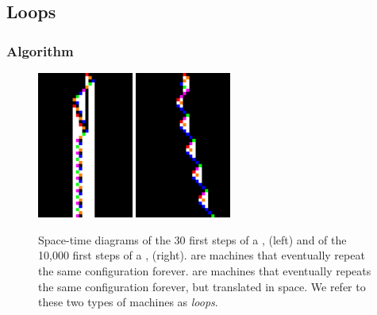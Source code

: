 \newpage
\subsection{Loops}\label{sec:loops}
\subsubsection{Algorithm}\label{sec:loops:algo}

\begin{figure}[h!]
    \centering
    \includegraphics[width=0.28\textwidth]{figures/space-time-diagrams/cycler_279081.pdf}
    \hspace{10ex}
    \includegraphics[width=0.28\textwidth]{figures/space-time-diagrams/tc_1RB---_1LB1LC_0RD0RC_1LE1RE_1LA0LE.pdf}
    \caption{Space-time diagrams of the 30 first steps of a \textit{\cycler},  (left) and of the 10,000 first steps of a \textit{\TC},  (right). \cyclers are machines that eventually repeat the same configuration forever. \TCs are machines that eventually repeats the same configuration forever, but translated in space. We refer to these two types of machines as \textit{loops}.}\label{fig:loops}
\end{figure}

